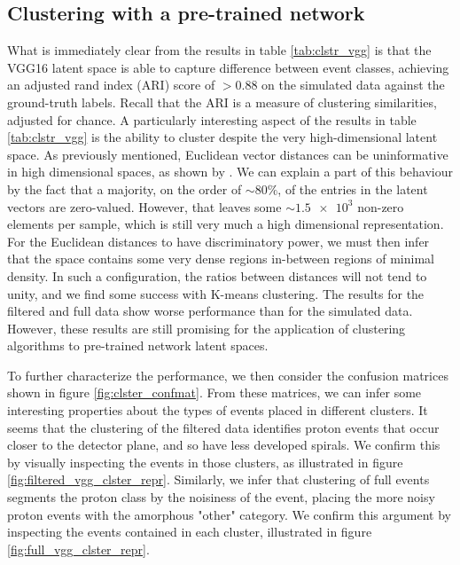 \subsection{Clustering with a pre-trained network}

What is immediately clear from the results in table \ref{tab:clstr_vgg} is that the VGG16 latent space is able to capture difference between event classes, achieving an adjusted rand index (ARI) score of $>0.88$ on the simulated data against the ground-truth labels. Recall that the ARI is a measure of clustering similarities, adjusted for chance. A particularly interesting aspect of the results in table \ref{tab:clstr_vgg} is the ability to cluster despite the very high-dimensional latent space. As previously mentioned, Euclidean vector distances can be uninformative in high dimensional spaces, as shown by \cite{Aggarwal}. We can explain a part of this behaviour by the fact that a majority, on the order of $\sim 80\%$, of the entries in the latent vectors are zero-valued. However, that leaves some $\sim \num{1.5e3}$ non-zero elements per sample, which is still very much a high dimensional representation. For the Euclidean distances to have discriminatory power, we must then infer that the space contains some very dense regions in-between regions of minimal density. In such a configuration, the ratios between distances will not tend to unity, and we find some success with K-means clustering. The results for the filtered and full data show worse performance than for the simulated data. However, these results are still promising for the application of clustering algorithms to pre-trained network latent spaces.

To further characterize the performance, we then consider the confusion matrices shown in figure \ref{fig:clster_confmat}. From these matrices, we can infer some interesting properties about the types of events placed in different clusters. It seems that the clustering of the filtered data identifies proton events that occur closer to the detector plane, and so have less developed spirals. We confirm this by visually inspecting the events in those clusters, as illustrated in figure \ref{fig:filtered_vgg_clster_repr}. Similarly, we infer that clustering of full events segments the proton class by the noisiness of the event, placing the more noisy proton events with the amorphous "other" category. We confirm this argument by inspecting the events contained in each cluster, illustrated in figure \ref{fig:full_vgg_clster_repr}.

